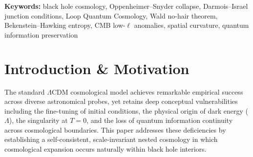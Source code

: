 \documentclass[11pt,a4paper]{article}
\theoremstyle{definition}
\begin{document}
\textbf{Keywords:} black hole cosmology, Oppenheimer--Snyder collapse, Darmois--Israel junction conditions, Loop Quantum Cosmology, Wald no-hair theorem, Bekenstein--Hawking entropy, CMB low-$\ell$ anomalies, spatial curvature, quantum information preservation

\tableofcontents

\section{Introduction \& Motivation}\label{sec:intro}
The standard $\Lambda$CDM cosmological model achieves remarkable empirical success across diverse astronomical probes, yet retains deep conceptual vulnerabilities including the fine-tuning of initial conditions, the physical origin of dark energy ($\Lambda$), the singularity at $T=0$, and the loss of quantum information continuity across cosmological boundaries. This paper addresses these deficiencies by establishing a self-consistent, scale-invariant nested cosmology in which cosmological expansion occurs naturally within black hole interiors.
\end{document}
